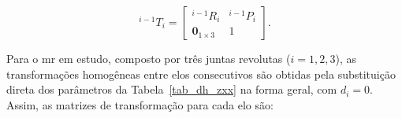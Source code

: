 \begin{equation}
{}^{i-1}T_i =
\begin{bmatrix}
{}^{i-1}R_i & {}^{i-1}P_i \\
\mathbf{0}_{1\times 3} & 1
\end{bmatrix}.
\label{eq_estrutura_submatrizes}
\end{equation}





Para o \gls{mr} em estudo, composto por três juntas revolutas ($i=1,2,3$), as transformações homogêneas entre elos consecutivos são obtidas pela substituição direta dos parâmetros da Tabela~\ref{tab_dh_zxx} na forma geral, com $d_i=0$. Assim, as matrizes de transformação para cada elo são:




